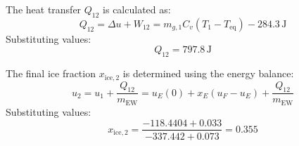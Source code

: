 The heat transfer \( Q_{12} \) is calculated as:  
\[
Q_{12} = \Delta u + W_{12} = m_{g,1} C_v (T_1 - T_{\text{eq}}) - 284.3 \, \text{J}
\]  
Substituting values:  
\[
Q_{12} = 797.8 \, \text{J}
\]  

The final ice fraction \( x_{\text{ice},2} \) is determined using the energy balance:  
\[
u_2 = u_1 + \frac{Q_{12}}{m_{\text{EW}}} = u_E(0) + x_E (u_{F} - u_E) + \frac{Q_{12}}{m_{\text{EW}}}
\]  
Substituting values:  
\[
x_{\text{ice},2} = \frac{-118.4404 + 0.033}{-337.442 + 0.073} = 0.355
\]